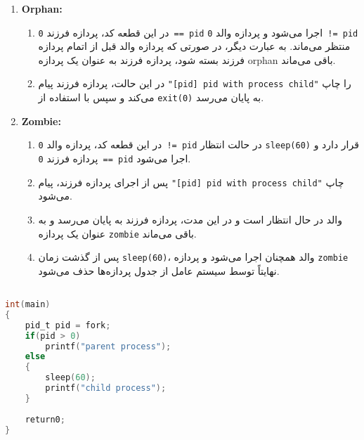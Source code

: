 \begin{qsolve}
\begin{enumerate}
	\item \textbf{Orphan:}
	\begin{enumerate}
		\item در این قطعه کد، پردازه فرزند \texttt{0 == pid} اجرا می‌شود و پردازه والد \texttt{0 != pid} منتظر می‌ماند. به عبارت دیگر، در صورتی که پردازه والد قبل از اتمام پردازه فرزند بسته شود، پردازه فرزند به عنوان یک پردازه orphan باقی می‌ماند.
		\item در این حالت، پردازه فرزند پیام \texttt{"[pid] pid with process child"} را چاپ می‌کند و سپس با استفاده از \texttt{exit(0)} به پایان می‌رسد.
	\end{enumerate}
	\item \textbf{Zombie:}
	\begin{enumerate}
		\item در این قطعه کد، پردازه والد \texttt{0 != pid} در حالت انتظار \texttt{sleep(60)} قرار دارد و پردازه فرزند \texttt{0 == pid} اجرا می‌شود.
		\item پس از اجرای پردازه فرزند، پیام \texttt{"[pid] pid with process child"} چاپ می‌شود.
		\item والد در حال انتظار است و در این مدت، پردازه فرزند به پایان می‌رسد و به عنوان یک پردازه \texttt{zombie} باقی می‌ماند.
		\item پس از گذشت زمان \texttt{sleep(60)}، والد همچنان اجرا می‌شود و پردازه \texttt{zombie} نهایتاً توسط سیستم عامل از جدول پردازه‌ها حذف می‌شود.
	\end{enumerate}
\end{enumerate}
\end{qsolve}














\begin{latin}
\begin{lstlisting}[label=first,caption=Some Code, language=C]

int(main)
{
	pid_t pid = fork;
	if(pid > 0)
		printf("parent process");
	else
	{
		sleep(60);
		printf("child process");
	}
	
	return0;
}

\end{lstlisting}
\end{latin}

